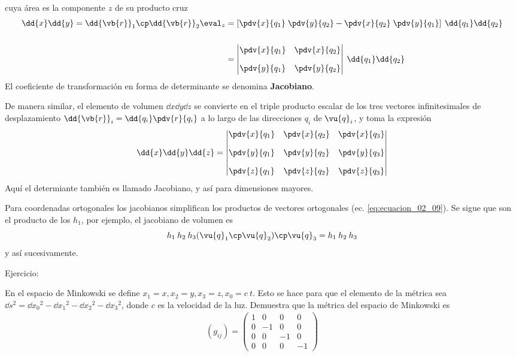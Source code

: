 cuya área es la componente $z$ de su producto cruz
\begin{align}
\begin{aligned}
 \dd{x} \dd{y} = \dd{\vb{r}}_{1} \cp \dd{\vb{r}}_{2} \eval_{z} &= \left[ \pdv{x}{q_{1}} \; \pdv{y}{q_{2}} - \pdv{x}{q_{2}} \; \pdv{y}{q_{1}} \right] \: \dd{q_{1}} \dd{q_{2}} \\[1.5em]
&= \begin{vmatrix}
\displaystyle{\pdv{x}{q_{1}}} & \displaystyle{\pdv{x}{q_{2}}} \\[1em]
\displaystyle{\pdv{y}{q_{1}}} & \displaystyle{\pdv{y}{q_{2}}} 
\end{vmatrix} \: \dd{q_{1}} \dd{q_{2}}
\end{aligned}
\label{eq:ecuacion_02_15}
\end{align}
El coeficiente de transformación en forma de determinante se denomina \textbf{Jacobiano}.
\par
De manera similar, el elemento de volumen $\dd{x} \dd{y} \dd{z}$ se convierte en el triple producto escalar de los tres vectores infinitesimales de desplazamiento $\displaystyle{\dd{\vb{r}}_{i}  = \dd{q_{i}} \pdv{r} {q_{i}}} $ a lo largo de las direcciones $q_{i}$ de $\vu{q}_{i}$, y toma la expresión
\begin{equation}
\dd{x} \dd{y} \dd{z} = \begin{vmatrix}
\displaystyle{\pdv{x}{q_{1}}} & \displaystyle{\pdv{x}{q_{2}}} & \displaystyle{\pdv{x}{q_{3}}} \\[1em]
\displaystyle{\pdv{y}{q_{1}}} & \displaystyle{\pdv{y}{q_{2}}} & \displaystyle{\pdv{y}{q_{3}}} \\[1em]
\displaystyle{\pdv{z}{q_{1}}} & \displaystyle{\pdv{z}{q_{2}}} & \displaystyle{\pdv{z}{q_{3}}} \\
\end{vmatrix}
\label{eq:ecuacion_02_16}
\end{equation}
Aquí el determiante también es llamado Jacobiano, y así para dimensiones mayores.
\par
Para coordenadas ortogonales los jacobianos simplifican los productos de vectores ortogonales (ec. \ref{eq:ecuacion_02_09}). Se sigue que son el producto de los $h_{1}$, por ejemplo, el jacobiano de volumen es
\[ h_{1} \: h_{2} \: h_{3} (\vu{q}_{1} \cp \vu{q}_{2} ) \cp \vu{q}_{3} = h_{1} \: h_{2} \: h_{3} \]
y así sucesivamente.
\par
Ejercicio:
\par
En el espacio de Minkowski se define $x_{1} = x, x_{2} = y, x_{3} = z, x_{0} = c \: t$. Esto se hace para que el elemento de la métrica sea $\dd{s^{2}} = \dd{x_{0}}^{2} - \dd{x_{1}}^{2} - \dd{x_{2}}^{2} - \dd{x_{3}}^{2}$, donde $c$ es la velocidad de la luz. Demuestra que la métrica del espacio de Minkowski es
\begin{align*}
(g_{ij}) = \begin{pmatrix}
1 & 0 & 0 & 0 \\
0 & -1 & 0 & 0 \\
0 & 0 & -1 & 0 \\
0 & 0 & 0 & -1
\end{pmatrix}
\end{align*} 
